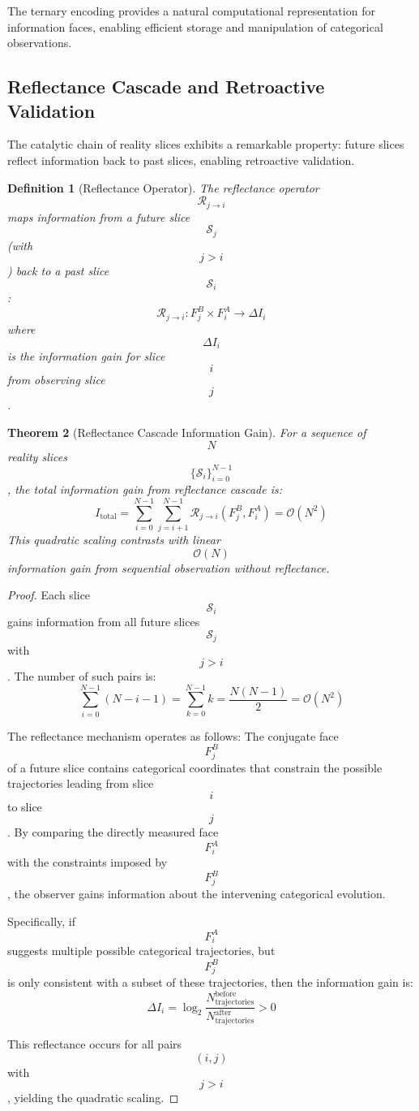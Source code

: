 \documentclass[11pt,twocolumn,a4paper]{article}
\newtheorem{theorem}{Theorem}[section]
\newtheorem{definition}[theorem]{Definition}
\theoremstyle{remark}
\begin{document}
The ternary encoding provides a natural computational representation for information faces, enabling efficient storage and manipulation of categorical observations.

\subsection{Reflectance Cascade and Retroactive Validation}

The catalytic chain of reality slices exhibits a remarkable property: future slices reflect information back to past slices, enabling retroactive validation.

\begin{definition}[Reflectance Operator]
\label{def:reflectance_operator}
The reflectance operator $$\mathcal{R}_{j \to i}$$ maps information from a future slice $$\mathcal{S}_j$$ (with $$j > i$$) back to a past slice $$\mathcal{S}_i$$:
$$
\mathcal{R}_{j \to i}: F_j^B \times F_i^A \to \Delta I_i
$$
where $$\Delta I_i$$ is the information gain for slice $$i$$ from observing slice $$j$$.
\end{definition}

\begin{theorem}[Reflectance Cascade Information Gain]
\label{thm:reflectance_cascade}
For a sequence of $$N$$ reality slices $$\{\mathcal{S}_i\}_{i=0}^{N-1}$$, the total information gain from reflectance cascade is:
$$
I_{\mathrm{total}} = \sum_{i=0}^{N-1} \sum_{j=i+1}^{N-1} \mathcal{R}_{j \to i}(F_j^B, F_i^A) = \mathcal{O}(N^2)
$$
This quadratic scaling contrasts with linear $$\mathcal{O}(N)$$ information gain from sequential observation without reflectance.
\end{theorem}

\begin{proof}
Each slice $$\mathcal{S}_i$$ gains information from all future slices $$\mathcal{S}_j$$ with $$j > i$$. The number of such pairs is:
$$
\sum_{i=0}^{N-1} (N - i - 1) = \sum_{k=0}^{N-1} k = \frac{N(N-1)}{2} = \mathcal{O}(N^2)
$$

The reflectance mechanism operates as follows: The conjugate face $$F_j^B$$ of a future slice contains categorical coordinates that constrain the possible trajectories leading from slice $$i$$ to slice $$j$$. By comparing the directly measured face $$F_i^A$$ with the constraints imposed by $$F_j^B$$, the observer gains information about the intervening categorical evolution.

Specifically, if $$F_i^A$$ suggests multiple possible categorical trajectories, but $$F_j^B$$ is only consistent with a subset of these trajectories, then the information gain is:
$$
\Delta I_i = \log_2 \frac{N_{\mathrm{trajectories}}^{\mathrm{before}}}{N_{\mathrm{trajectories}}^{\mathrm{after}}} > 0
$$

This reflectance occurs for all pairs $$(i,j)$$ with $$j > i$$, yielding the quadratic scaling.
\end{proof}
\end{document}
